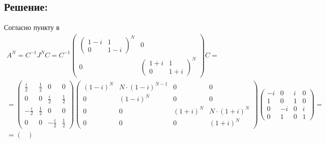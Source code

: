 \documentclass[12pt]{article}
\begin{document}
    \subsection*{Решение:}
    Согласно пункту в
    \begin{multline*}
        A^N
        = C^{-1} J^N C
        = C^{-1}
        \begin{pmatrix}
            \begin{pmatrix}
                1 - i & 1     \\
                0     & 1 - i
            \end{pmatrix}^N & 0 \\
            0 & \begin{pmatrix}
                    1 + i & 1     \\
                    0     & 1 + i
            \end{pmatrix}^N
        \end{pmatrix}
        C = \\
        =
        \begin{pmatrix}
            \frac{i}{2}   & \frac{1}{2} & 0            & 0           \\
            0             & 0           & \frac{i}{2}  & \frac{1}{2} \\
            - \frac{i}{2} & \frac{1}{2} & 0            & 0           \\
            0             & 0           & -\frac{i}{2} & \frac{1}{2}
        \end{pmatrix}
        \begin{pmatrix}
        ( 1 - i )
            ^N & N \cdot ( 1 - i )^{N-1} & 0           & 0                   \\
            0  & ( 1 - i )^N             & 0           & 0                   \\
            0  & 0                       & ( 1 + i )^N & N \cdot ( 1 + i )^N \\
            0  & 0                       & 0           & ( 1 + i )^N
        \end{pmatrix}
        \begin{pmatrix}
            -i & 0  & i & 0 \\
            1  & 0  & 1 & 0 \\
            0  & -i & 0 & i \\
            0  & 1  & 0 & 1
        \end{pmatrix} = \\
        =
        \begin{pmatrix}

\end{pmatrix}
\end{multline*}
\end{document}
